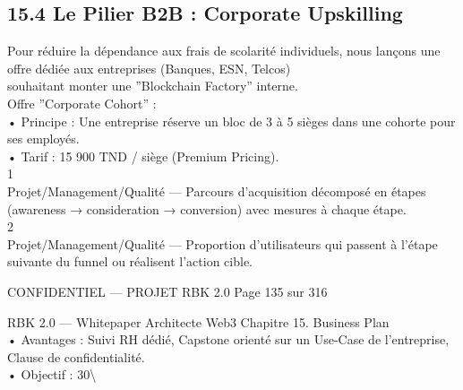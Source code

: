 \documentclass[12pt,landscape,a4paper]{article}
\newenvironment{confidential}
{\begin{tcolorbox}[
    colback=rbkred!5!white,
    colframe=rbkred!75!black,
    title=CONFIDENTIEL,
    fonttitle=\bfseries\color{white},
    coltitle=rbkred!75!black,
    breakable,
    enhanced,
    frame hidden,
    borderline west={2pt}{0pt}{rbkred!75!black}
]}
{\end{tcolorbox}}
\begin{document}
\subsection{15.4 Le Pilier B2B : Corporate Upskilling}
Pour réduire la dépendance aux frais de scolarité individuels, nous lançons une offre dédiée aux entreprises (Banques, ESN, Telcos)\\
souhaitant monter une ”Blockchain Factory” interne.\\
Offre ”Corporate Cohort” :\\
\vspace{0.5em}
• Principe : Une entreprise réserve un bloc de 3 à 5 sièges dans une cohorte pour ses employés.\\
\vspace{0.5em}
• Tarif : 15 900 TND / siège (Premium Pricing).\\
1\\
Projet/Management/Qualité — Parcours d’acquisition décomposé en étapes (awareness → consideration → conversion) avec mesures à chaque étape.\\
2\\
Projet/Management/Qualité — Proportion d’utilisateurs qui passent à l’étape suivante du funnel ou réalisent l’action cible.\\
\vspace{0.5em}
\vspace{0.5em}
\begin{confidential}CONFIDENTIEL — PROJET RBK 2.0                                        Page 135 sur 316\end{confidential}
RBK 2.0 — Whitepaper Architecte Web3                                                                            Chapitre 15. Business Plan\\
\vspace{0.5em}
\vspace{0.5em}
• Avantages : Suivi RH dédié, Capstone orienté sur un Use-Case de l’entreprise, Clause de confidentialité.\\
\vspace{0.5em}
• Objectif : 30\textbackslash{}%
\vspace{0.5em}
\vspace{0.5em}
\end{document}

